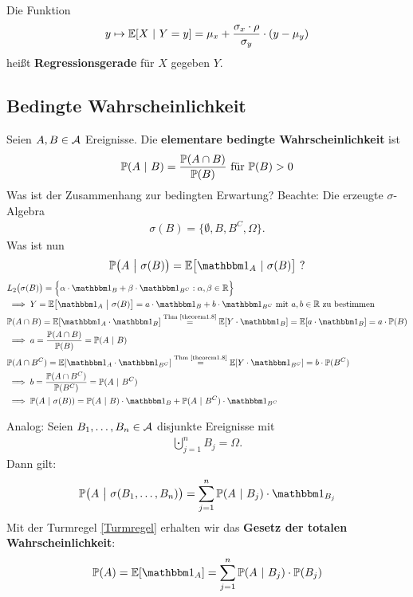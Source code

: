 \begin{bemerkung}
Die Funktion
\begin{align*}
y\mapsto\E[X~|~Y=y]=\mu_x+\frac{\sigma_x\cdot\rho}{\sigma_y}\cdot(y-\mu_y)
\end{align*}
heißt \textbf{Regressionsgerade} für $X$ gegeben $Y$.
\end{bemerkung}

\subsection*{Bedingte Wahrscheinlichkeit}
Seien $A,B\in\A$ Ereignisse. Die \textbf{elementare bedingte Wahrscheinlichkeit} ist 
\begin{align*}
\P(A~|~B)=\frac{\P(A\cap B)}{\P(B)}\text{ für }\P(B)>0
\end{align*}
Was ist der Zusammenhang zur bedingten Erwartung?\nl
Beachte: Die erzeugte $\sigma$-Algebra 
\begin{align*}
\sigma(B)=\big\lbrace\emptyset,B,B^C,\Omega\big\rbrace.
\end{align*}
Was ist nun 
\begin{align*}
\P\big(A~\big|~\sigma(B)\big)=\E\big[\indi_A~|~\sigma(B)\big]\text{ ?}
\end{align*}
\begin{align*}
&L_2\big(\sigma(B)\big)=\Big\lbrace \alpha\cdot\indi_B+\beta\cdot\indi_{B^C}:\alpha,\beta\in\R\Big\rbrace\\
&\implies
Y=\E\big[\indi_A~\big|~\sigma(B)\big]=a\cdot\indi_B+b\cdot\indi_{B^C}\mit a,b\in\R\text{ zu bestimmen}\\
&\P(A\cap B)=\E[\indi_A\cdot\indi_B]
\stackeq{\text{Thm \ref{theorem1.8}}}
\E[Y\cdot\indi_B]=\E[a\cdot\indi_B]=a\cdot\P(B)\\
&\implies
a=\frac{\P(A\cap B)}{\P(B)}=\P(A~|~B)\\
&\P(A\cap B^C)=\E[\indi_A\cdot\indi_{B^C}]
\stackeq{\text{Thm \ref{theorem1.8}}}
\E[Y\cdot\indi_{B^C}]=b\cdot\P(B^C)\\
&\implies
b=\frac{\P(A\cap B^C)}{\P(B^C)}=\P(A~|~B^C)\\
&\implies
\P(A~|~\sigma(B))=\P(A~|~B)\cdot\indi_B+\P(A~|~B^C)\cdot\indi_{B^C}
\end{align*}

Analog: Seien $B_1,\ldots,B_n\in\A$ disjunkte Ereignisse mit
\begin{align*}
\bigcupdot\limits_{j=1}^n B_j=\Omega.
\end{align*}
Dann gilt:
\begin{align*}
\P\big(A~\big|~\sigma(B_1,\ldots,B_n)\big)=\sum\limits_{j=1}^n\P(A~|~B_j)\cdot\indi_{B_j}
\end{align*}
Mit der Turmregel \eqref{Turmregel} erhalten wir das \textbf{Gesetz der totalen Wahrscheinlichkeit}:
\begin{align*}
\P(A)=\E[\indi_A]=\sum\limits_{j=1}^n \P(A~|~B_j)\cdot\P(B_j)
\end{align*}

